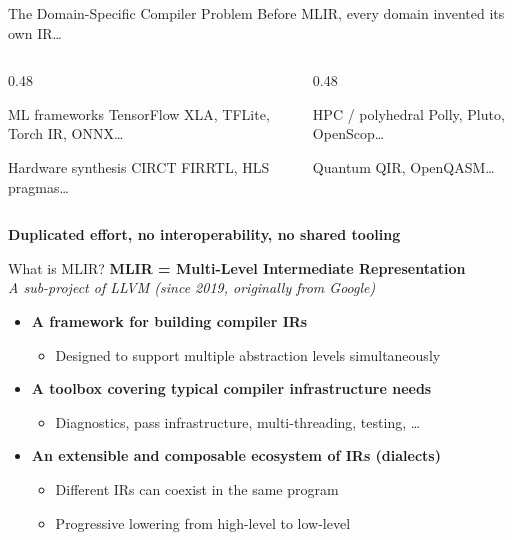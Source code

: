 \begin{frame}{The Domain-Specific Compiler Problem}
  Before MLIR, every domain invented its own IR\ldots

  \bigskip
  \begin{columns}
    \begin{column}{0.48\textwidth}
      \begin{block}{ML frameworks}
        TensorFlow XLA, TFLite, Torch IR, ONNX\ldots
      \end{block}
      \medskip
      \begin{block}{Hardware synthesis}
        CIRCT FIRRTL, HLS pragmas\ldots
      \end{block}
    \end{column}
    \begin{column}{0.48\textwidth}
      \begin{exampleblock}{HPC / polyhedral}
        Polly, Pluto, OpenScop\ldots
      \end{exampleblock}
      \medskip
      \begin{exampleblock}{Quantum}
        QIR, OpenQASM\ldots
      \end{exampleblock}
    \end{column}
  \end{columns}

  \bigskip
  \begin{center}
    \textbf{\textcolor{mainAccent}{%
      Duplicated effort, no interoperability, no shared tooling}}
  \end{center}
\end{frame}


\begin{frame}{What is MLIR?}
  \textbf{MLIR = Multi-Level Intermediate Representation}\\
  \textit{\small A sub-project of LLVM (since 2019, originally from Google)}

  \bigskip
  \begin{itemize}
    \item \textbf{A framework for building compiler IRs}
      \begin{itemize}
        \item Designed to support multiple abstraction levels simultaneously
      \end{itemize}
    \item \textbf{A toolbox covering typical compiler infrastructure needs}
      \begin{itemize}
        \item Diagnostics, pass infrastructure, multi-threading, testing, \ldots
      \end{itemize}
    \item \textbf{An extensible and composable ecosystem of IRs (dialects)}
      \begin{itemize}
        \item Different IRs can coexist in the same program
        \item Progressive lowering from high-level to low-level
      \end{itemize}
  \end{itemize}
\end{frame}


